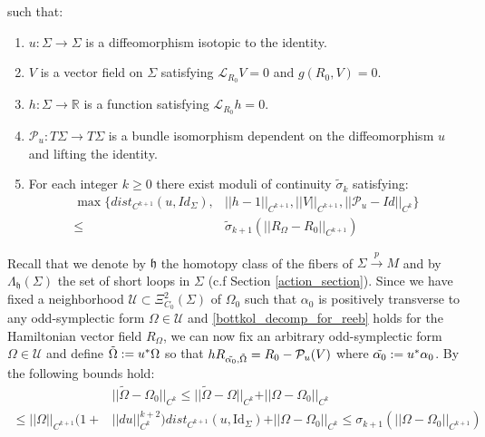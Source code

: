 \documentclass[11pt]{amsart}
\theoremstyle{plain}
\theoremstyle{definition}
\theoremstyle{remark}
\begin{document}
such that:\begin{enumerate}
    \item $u:\Sigma \rightarrow \Sigma$ is a diffeomorphism isotopic to the identity.
    \item $V$ is a vector field on  $\Sigma$ satisfying $\mathcal{L}_{R_{0}} V =0$ and $g(R_{0}, V) =0 $.
    \item $h: \Sigma \rightarrow \mathbb{R}$ is a function satisfying $\mathcal{L}_{R_{0}} h =0$. 
    \item $\mathcal{P}_{u}: T\Sigma \rightarrow T\Sigma$ is a bundle isomorphism dependent on the diffeomorphism $u$ and lifting the identity. 
    \item For each integer $k \geq 0$ there exist moduli of continuity $\tilde{\sigma}_k$ satisfying:
\begin{align}\label{normal_form_bounds_1}
 \max \Big\{dist_{C^{k+1}}(u,Id_{\Sigma}), &\vert\vert h-1\vert\vert_{C^{k+1}}, \vert\vert V\vert\vert_{C^{k+1}}, \vert\vert\mathcal{P}_u -Id \vert\vert_{C^{k}} \Big\} \\\nonumber \leq \;\; &\tilde{\sigma}_{k+1}(\vert\vert R_{\Omega} - R_{0} \vert\vert_{C^{k+1}})
\end{align}
\end{enumerate}
Recall that we denote by $\mathfrak{h}$ the homotopy class of the fibers of $\Sigma \xrightarrow{p} M$ and by $\Lambda_{\mathfrak{h}}(\Sigma)$ the set of short loops in $\Sigma$ (c.f Section \ref{action_section}). Since we have fixed a neighborhood $\mathcal{U} \subset \Xi^2_{C_0}(\Sigma)$ of $\Omega_0$ such that $\alpha_0$ is positively transverse to any odd-symplectic form $\Omega \in \mathcal{U}$ and \eqref{bottkol_decomp_for_reeb} holds for the Hamiltonian vector field $R_{\Omega}$, we can now fix an arbitrary odd-symplectic form $\Omega \in \mathcal{U}$ and define $\Tilde{\Omega}:= u^*\Omega$ so that $hR_{\Tilde{\alpha_0}, \Tilde{\Omega}} = R_{0} - \mathcal{P}_{u}(V)$ where $\Tilde{\alpha_0}:= u^*\alpha_0$. By \cite[Lemma 1.1]{Abbondandolo-Benedetti} the following bounds hold:
\begin{align}\label{bounds_of_omega_tilde_minus_omega}
    &\vert \vert \tilde{\Omega} - \Omega_0\vert \vert_{C^{k}} \leq \vert \vert\tilde{\Omega} - \Omega\vert \vert_{C^{k}} + \vert \vert\Omega - \Omega_0\vert \vert_{C^k } \\ \leq \nonumber
    \vert \vert\Omega\vert \vert_{C^{k+1}} \Big(1+ &\vert \vert du\vert \vert^{k+2}_{C^{k}} \Big) dist_{C^{k+1}}(u,\text{Id}_{\Sigma})  +\vert \vert\Omega - \Omega_0\vert \vert_{C^k}  \leq \sigma_{k+1}(\vert \vert\Omega - \Omega_0\vert \vert_{C^{k+1}})
\end{align}
\end{document}
